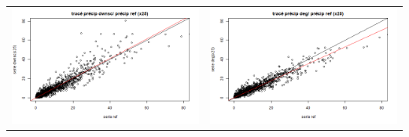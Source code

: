 \documentclass[a4paper,10pt]{article}
\begin{document}
\begin{tabular}{cc}
	\includegraphics[scale=0.4]{images/pr_2_ds.png} & \includegraphics[scale=0.4]{images/pr_2_dg.png}  \\
\end{tabular}
\end{document}
